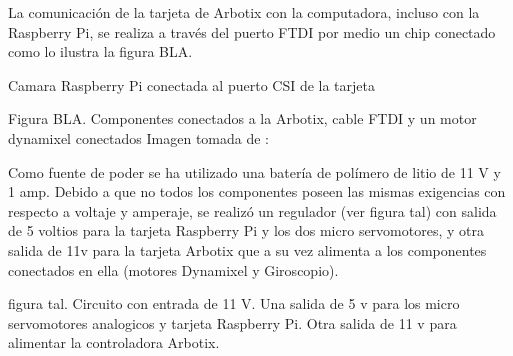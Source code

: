 La comunicación de la tarjeta de Arbotix con la computadora, incluso con la Raspberry Pi, se realiza a través del puerto FTDI por medio un chip conectado como lo ilustra la figura BLA.


Camara Raspberry Pi conectada al puerto CSI de la tarjeta



Figura BLA. Componentes conectados a la Arbotix, cable FTDI y un motor dynamixel conectados 
Imagen tomada de : %

Como fuente de poder se ha utilizado una batería de polímero de litio de 11 V y 1 amp. Debido a que no todos los componentes poseen las mismas exigencias con respecto a voltaje y amperaje, se realizó un regulador (ver figura tal) con  salida de 5 voltios para la tarjeta Raspberry Pi y los dos micro servomotores, y otra salida de 11v para la tarjeta Arbotix que a su vez alimenta a los componentes conectados en ella (motores Dynamixel y Giroscopio).


figura tal. Circuito con entrada de 11 V. Una salida de 5 v para los micro servomotores analogicos y tarjeta Raspberry Pi. Otra salida de 11 v para alimentar la controladora Arbotix.   

